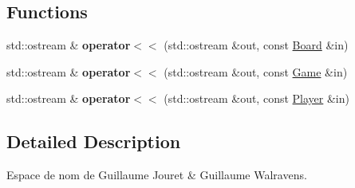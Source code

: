 \subsection*{Functions}
\begin{DoxyCompactItemize}
\item 
std\+::ostream \& {\bfseries operator$<$$<$} (std\+::ostream \&out, const \hyperlink{class_g_j___g_w_1_1_board}{Board} \&in)\hypertarget{namespace_g_j___g_w_acd223b01543d5d5fe2d3ae15cd908bd9}{}\label{namespace_g_j___g_w_acd223b01543d5d5fe2d3ae15cd908bd9}

\item 
std\+::ostream \& {\bfseries operator$<$$<$} (std\+::ostream \&out, const \hyperlink{class_g_j___g_w_1_1_game}{Game} \&in)\hypertarget{namespace_g_j___g_w_a81b49299d3d364d4308258c2f250cc54}{}\label{namespace_g_j___g_w_a81b49299d3d364d4308258c2f250cc54}

\item 
std\+::ostream \& {\bfseries operator$<$$<$} (std\+::ostream \&out, const \hyperlink{class_g_j___g_w_1_1_player}{Player} \&in)\hypertarget{namespace_g_j___g_w_afcf0bedeefbc852b3ec7d91fd6ac1f35}{}\label{namespace_g_j___g_w_afcf0bedeefbc852b3ec7d91fd6ac1f35}

\end{DoxyCompactItemize}


\subsection{Detailed Description}
Espace de nom de Guillaume Jouret \& Guillaume Walravens. 